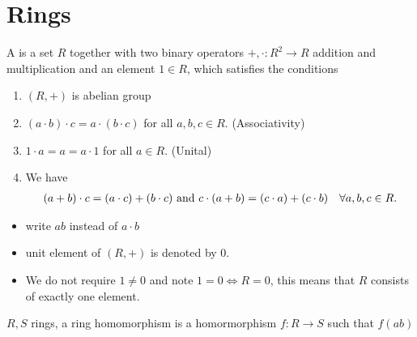 \section{Rings}
\begin{definition}
	A  is a set $R$ together with two binary operators $+,\cdot \colon R^2 \to R$ addition and multiplication and an element $1 \in R$, which satisfies the conditions
	\begin{enumerate}
		\item $(R,+)$ is abelian group
		\item $(a\cdot b)\cdot c = a \cdot (b\cdot c)$ for all $a,b,c \in R$. (Associativity)
		\item $1\cdot a = a = a \cdot 1$ for all $a \in R$. (Unital)
		\item We have
		\begin{align*}
			(a+b)\cdot c = (a\cdot c) + (b \cdot c) \text{ and } c\cdot (a+b) = (c\cdot a) + (c \cdot b) \quad \forall a,b,c \in R.
		\end{align*}
	\end{enumerate}
\end{definition}
\begin{*remark}
	\begin{itemize}
		\item write $ab$ instead of $a\cdot b$
		\item unit element of $(R,+)$ is denoted by 0.
		\item We do not require $1\neq 0$ and note $1=0 \iff R = 0$, this means that $R$ consists of exactly one element.
	\end{itemize}
\end{*remark}
\begin{definition}
	$R,S$ rings, a ring homomorphism is a homormorphism $f\colon R \to S$ such that $f(ab)$
\end{definition}